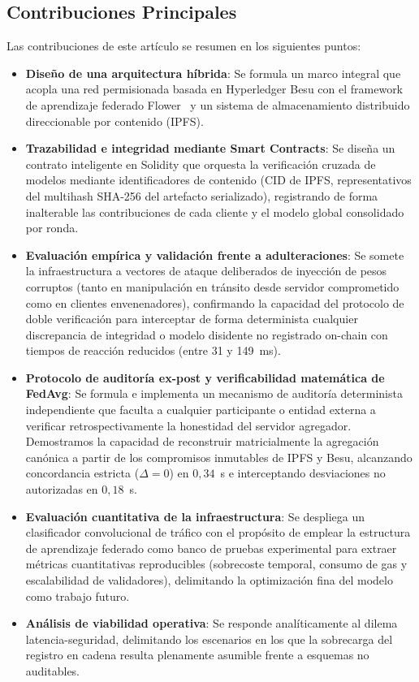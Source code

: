\subsection{Contribuciones Principales}
Las contribuciones de este artículo se resumen en los siguientes puntos:
\begin{itemize}
    \item \textbf{Diseño de una arquitectura híbrida}: Se formula un marco integral que acopla una red permisionada basada en Hyperledger Besu con el framework de aprendizaje federado Flower~\cite{beutel2020flower} y un sistema de almacenamiento distribuido direccionable por contenido (IPFS).
    \item \textbf{Trazabilidad e integridad mediante Smart Contracts}: Se diseña un contrato inteligente en Solidity que orquesta la verificación cruzada de modelos mediante identificadores de contenido (CID de IPFS, representativos del multihash SHA-256 del artefacto serializado), registrando de forma inalterable las contribuciones de cada cliente y el modelo global consolidado por ronda.
    \item \textbf{Evaluación empírica y validación frente a adulteraciones}: Se somete la infraestructura a vectores de ataque deliberados de inyección de pesos corruptos (tanto en manipulación en tránsito desde servidor comprometido como en clientes envenenadores), confirmando la capacidad del protocolo de doble verificación para interceptar de forma determinista cualquier discrepancia de integridad o modelo disidente no registrado on-chain con tiempos de reacción reducidos (entre 31 y 149~ms).
    \item \textbf{Protocolo de auditoría ex-post y verificabilidad matemática de FedAvg}: Se formula e implementa un mecanismo de auditoría determinista independiente que faculta a cualquier participante o entidad externa a verificar retrospectivamente la honestidad del servidor agregador. Demostramos la capacidad de reconstruir matricialmente la agregación canónica a partir de los compromisos inmutables de IPFS y Besu, alcanzando concordancia estricta ($\Delta = 0$) en $0{,}34$~s e interceptando desviaciones no autorizadas en $0{,}18$~s.
    \item \textbf{Evaluación cuantitativa de la infraestructura}: Se despliega un clasificador convolucional de tráfico con el propósito de emplear la estructura de aprendizaje federado como banco de pruebas experimental para extraer métricas cuantitativas reproducibles (sobrecoste temporal, consumo de gas y escalabilidad de validadores), delimitando la optimización fina del modelo como trabajo futuro.
    \item \textbf{Análisis de viabilidad operativa}: Se responde analíticamente al dilema latencia-seguridad, delimitando los escenarios en los que la sobrecarga del registro en cadena resulta plenamente asumible frente a esquemas no auditables.
\end{itemize}

